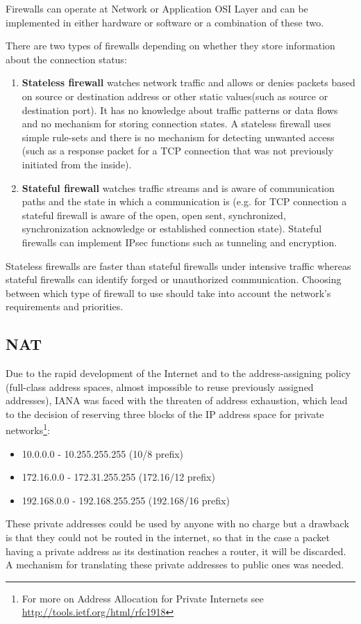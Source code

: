 Firewalls can operate at Network or Application OSI Layer and can be implemented in either hardware or software or a combination of these two.
 
There are two types of firewalls depending on whether they store information about the connection status:
\begin{enumerate}
\item{\textbf{Stateless firewall}} watches network traffic and  allows or denies packets based on source or destination address or other static values(such as source or destination port). It has no knowledge about traffic patterns or data flows and no mechanism for storing connection states. A stateless firewall uses simple rule-sets and there is no mechanism for detecting unwanted access (such as a response packet for a TCP connection that was not previously initiated from the inside).
\item{\textbf{Stateful firewall}} watches traffic streams and is aware of communication paths and the state in which a communication is (e.g. for TCP connection a stateful firewall is aware of the open, open sent, synchronized, synchronization acknowledge or established connection state). Stateful firewalls can implement IPsec functions such as tunneling and encryption.
\end{enumerate}
Stateless firewalls are faster than stateful firewalls under intensive traffic whereas stateful firewalls can identify forged or unauthorized communication.
Choosing between which type of firewall to use should take into account the network's requirements and priorities.  
\subsection{NAT}
\label{sub-sec:nat}
Due to the rapid development of the Internet and to the address-assigning policy (full-class address spaces, almost impossible to reuse previously assigned addresses), IANA was faced with the threaten of address exhaustion, which lead to the decision of reserving three blocks of the IP address space for private networks\footnote{For more on Address Allocation for Private Internets see \url{http://tools.ietf.org/html/rfc1918}}:
\begin{itemize}
\item10.0.0.0        -   10.255.255.255  (10/8 prefix)
\item172.16.0.0      -   172.31.255.255  (172.16/12 prefix)
\item192.168.0.0     -   192.168.255.255 (192.168/16 prefix)
\end{itemize}
These private addresses could be used by anyone with no charge but a drawback is that they could not be routed in the internet, so that in the case a packet having a private address as its destination reaches a router, it will be discarded. A mechanism for translating these private addresses to public ones was needed.

